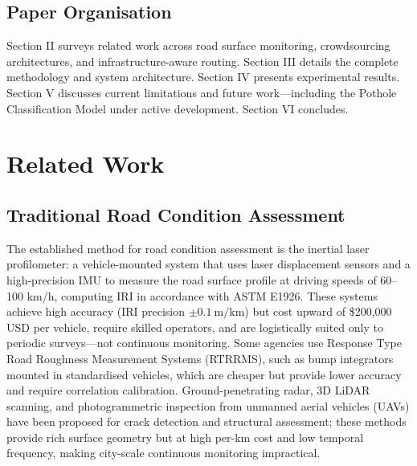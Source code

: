 \documentclass[conference]{IEEEtran}
\begin{document}
\subsection{Paper Organisation}
Section II surveys related work across road surface monitoring, crowdsourcing architectures, and infrastructure-aware routing.
Section III details the complete methodology and system architecture. Section IV presents experimental results.
Section V discusses current limitations and future work---including the Pothole Classification Model under active development. Section VI concludes.

\section{Related Work}

\subsection{Traditional Road Condition Assessment}
The established method for road condition assessment is the inertial laser profilometer: a vehicle-mounted system that uses laser displacement sensors and a high-precision IMU to measure the road surface profile at driving speeds of 60--100 km/h, computing IRI in accordance with ASTM E1926.
These systems achieve high accuracy (IRI precision $\pm0.1~\text{m/km}$) but cost upward of \$200,000 USD per vehicle, require skilled operators, and are logistically suited only to periodic surveys---not continuous monitoring.
Some agencies use Response Type Road Roughness Measurement Systems (RTRRMS), such as bump integrators mounted in standardised vehicles, which are cheaper but provide lower accuracy and require correlation calibration.
Ground-penetrating radar, 3D LiDAR scanning, and photogrammetric inspection from unmanned aerial vehicles (UAVs) have been proposed for crack detection and structural assessment;
these methods provide rich surface geometry but at high per-km cost and low temporal frequency, making city-scale continuous monitoring impractical.
\end{document}
